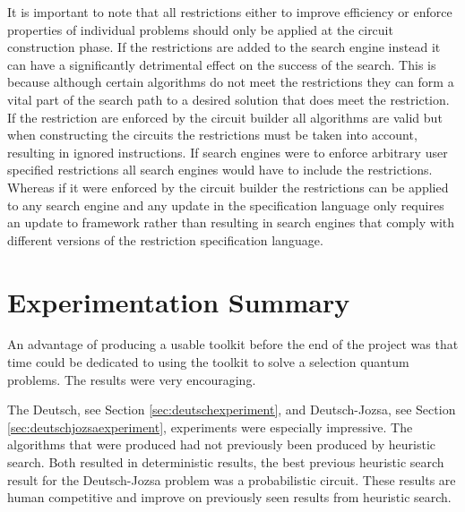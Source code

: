 It is important to note that all restrictions either to improve efficiency or enforce properties of individual problems should only be applied at the circuit construction phase.
If the restrictions are added to the search engine instead it can have a significantly detrimental effect on the success of the search.
This is because although certain algorithms do not meet the restrictions they can form a vital part of the search path to a desired solution that does meet the restriction.
If the restriction are enforced by the circuit builder all algorithms are valid but when constructing the circuits the restrictions must be taken into account, resulting in ignored instructions.
If search engines were to enforce arbitrary user specified restrictions all search engines would have to include the restrictions.
Whereas if it were enforced by the circuit builder the restrictions can be applied to any search engine and any update in the specification language only requires an update to framework rather than resulting in search engines that comply with different versions of the restriction specification language.

\section{Experimentation Summary}

An advantage of producing a usable toolkit before the end of the project was that time could be dedicated to using the toolkit to solve a selection quantum problems.
The results were very encouraging.

The Deutsch, see Section \ref{sec:deutschexperiment}, and Deutsch-Jozsa, see Section \ref{sec:deutschjozsaexperiment}, experiments were especially impressive.
The algorithms that were produced had not previously been produced by heuristic search.
Both resulted in deterministic results, the best previous heuristic search result for the Deutsch-Jozsa problem was a probabilistic circuit.
These results are human competitive and improve on previously seen results from heuristic search.

